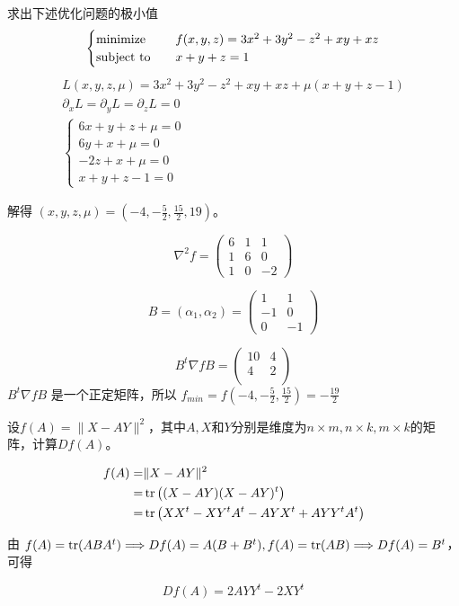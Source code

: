 \begin{problem}
	求出下述优化问题的极小值\[\begin{cases}
		\operatorname{minimize}\quad & f(x, y, z)=3 x^{2}+3 y^{2}-z^{2}+x y+x z \\
		\operatorname{subject\ to}\quad & x+y+z=1
	\end{cases}\]
	\solution \begin{gather*}
		L(x, y, z, \mu) = 3x^2 + 3y^2 - z^2 + xy + xz + \mu(x + y + z - 1)\\
		\partial_xL = \partial_yL = \partial_zL = 0\\
		\begin{cases}
			6x + y + z + \mu = 0\\
			6y + x + \mu = 0\\
			-2z + x + \mu = 0\\
			x + y + z - 1 = 0
		\end{cases}
	\end{gather*}
	
	解得 $(x, y, z, \mu) = (-4, -\frac{5}{2}, \frac{15}{2}, 19)$。

	$$\nabla^2 f = \begin{pmatrix}
		6 & 1 & 1 \\
		1 & 6 & 0 \\
		1 & 0 & -2
	\end{pmatrix}$$

	$$B = (\alpha_1, \alpha_2) = \begin{pmatrix}
		1 & 1 \\
		-1 & 0 \\ 
		0 & -1
	\end{pmatrix}$$

	$$B^t\nabla f B = \begin{pmatrix}
		 10 & 4 \\ 
		 4 & 2 \\
	\end{pmatrix}$$
	$B^t\nabla f B$ 是一个正定矩阵，所以 $f_{min} = f(-4, -\frac{5}{2}, \frac{15}{2}) =  -\frac{19}{2}$
\end{problem}

\begin{problem}
	设$f(A)=\|X-AY\|^2$，其中$A,X$和$Y$分别是维度为$n\times m,n\times k,m\times k$的矩阵，计算$Df(A)$。
\end{problem}
\begin{solution}
	$$\begin{aligned}
		f(A) =& \|X - AY\|^2 \\
		=& \operatorname{tr}\left((X - AY)(X - AY)^t\right) \\
		=& \operatorname{tr}\left(XX^t - XY^tA^t - AYX^t + AYY^tA^t\right)
	\end{aligned}$$

	由 $f(A) = \operatorname{tr}(ABA^t) \Longrightarrow Df(A) = A(B + B^t), f(A) = \operatorname{tr}(AB) \Longrightarrow Df(A) = B^t$，可得 
	
	$$Df(A) = 2AYY^t - 2XY^t$$
\end{solution}


